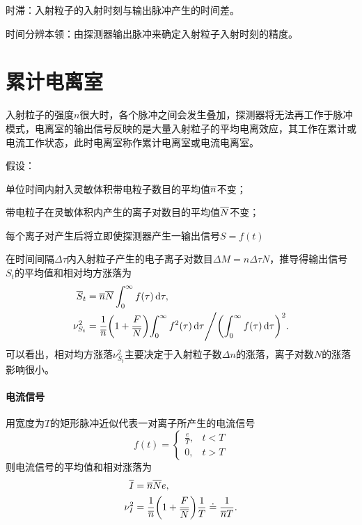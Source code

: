 时滞：入射粒子的入射时刻与输出脉冲产生的时间差。

时间分辨本领：由探测器输出脉冲来确定入射粒子入射时刻的精度。

\section{累计电离室}

入射粒子的强度$n$很大时，各个脉冲之间会发生叠加，探测器将无法再工作于脉冲模式，电离室的输出信号反映的是大量入射粒子的平均电离效应，其工作在累计或电流工作状态，此时电离室称作累计电离室或电流电离室。


假设：
\begin{compactenum}
	\item 单位时间内射入灵敏体积带电粒子数目的平均值$\overline{n}$不变；
	\item 带电粒子在灵敏体积内产生的离子对数目的平均值$\overline{N}$不变；
	\item 每个离子对产生后将立即使探测器产生一输出信号$S = f(t)$
\end{compactenum}
在时间间隔$\Delta\tau$内入射粒子产生的电子离子对数目$\Delta M = n\Delta\tau N$，推导得输出信号$S_t$的平均值和相对均方涨落为
\begin{subequations}\label{eq:nrd-current-mode-fluctuations}
	\begin{align}
		\overline{S}_t &= \overline{n}\overline{N}\int_0^\infty f(\tau)\mathop{}\!\mathrm{d}\tau,\\
		\nu_{S_t}^2 &= \frac1{\overline{n}}\biggl(1 + \frac F{\overline{N}}\biggr){\int_0^\infty f^2(\tau)\mathop{}\!\mathrm{d}\tau}\Bigg/{\biggl(\int_0^\infty f(\tau)\mathop{}\!\mathrm{d}\tau\biggr)^2}.
	\end{align}
\end{subequations}
可以看出，相对均方涨落$\nu_{S_t}^2$主要决定于入射粒子数$\Delta n$的涨落，离子对数$N$的涨落影响很小。
\paragraph{电流信号}用宽度为$T$的矩形脉冲近似代表一对离子所产生的电流信号
\[
	f(t) = \begin{cases}
		\frac eT,&t < T\\
		0,&t > T
	\end{cases}
\]
则电流信号的平均值和相对涨落为
\begin{align}
	\overline{I} &= \overline{n}\overline{N}e,\\
	\nu_I^2 &= \frac1{\overline{n}}\biggl(1 + \frac F{\overline{N}}\biggr)\frac1T \doteq \frac1{\overline{n}T}.
\end{align}
